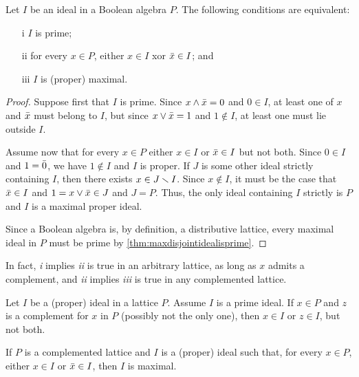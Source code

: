 \begin{propoBoolPrimeIsMax}\label{thm:boolprimeismax}
	Let $I$ be an ideal in a Boolean algebra $P$. The following
	conditions are equivalent:
	\begin{itemize}
		\item[i] $I$ is prime;
		\item[ii] for every $x\in P$, either $x\in I$ xor
			$\bar{x}\in I$; and
		\item[iii] $I$ is (proper) maximal.
	\end{itemize}
\end{propoBoolPrimeIsMax}

\begin{proof}
	Suppose first that $I$ is prime. Since $x\wedge\bar{x}=0$
	and $0\in I$, at least one of $x$ and $\bar{x}$ must belong to
	$I$, but since $x\vee\bar{x}=1$ and $1\not\in I$, at least
	one must lie outside $I$.

	Assume now that for every $x\in P$ either $x\in I$ or $\bar{x}\in I$
	but not both. Since $0\in I$ and $1=\bar{0}$, we have $1\not\in I$
	and $I$ is proper. If $J$ is some other ideal strictly containing $I$,
	then there exists $x\in J\smallsetminus I$. Since $x\not\in I$, it must
	be the case that $\bar{x}\in I$ and $1=x\vee\bar{x}\in J$
	and $J=P$. Thus, the only ideal containing $I$ strictly is $P$
	and $I$ is a maximal proper ideal.

	Since a Boolean algebra is, by definition, a distributive lattice,
	every maximal ideal in $P$ must be prime by
	\ref{thm:maxdisjointidealisprime}.
\end{proof}
In fact, \textit{i} implies \textit{ii} is true in an arbitrary
lattice, as long as $x$ admits a complement, and \textit{ii} implies
\textit{iii} is	true in any complemented lattice.

\begin{propoPrimeIdealIsMax}\label{thm:primeidealismax}
	Let $I$ be a (proper) ideal in a lattice $P$. Assume $I$ is a prime
	ideal. If $x\in P$ and $z$ is a complement for $x$ in $P$ (possibly
	not the only one), then $x\in I$ or $z\in I$, but not both.

	If $P$ is a complemented lattice and $I$ is a (proper) ideal such
	that, for every $x\in P$, either $x\in I$ or $\bar{x}\in I$, then
	$I$ is maximal.
\end{propoPrimeIdealIsMax}

